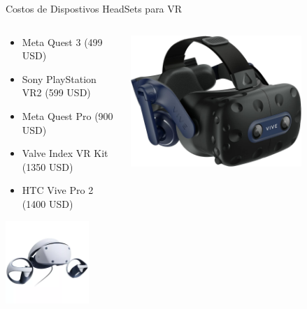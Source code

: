 
\begin{frame}{Costos de Dispostivos HeadSets para VR}
\begin{columns}
\begin{column}{0.49\textwidth}
\begin{itemize}
\item Meta Quest 3 (499 USD)
\item Sony PlayStation VR2 (599 USD)
\item Meta Quest Pro (900 USD)
\item Valve Index VR Kit (1350 USD)
\item HTC Vive Pro 2 (1400 USD)
\end{itemize}

\begin{center}
\includegraphics[width=0.75\textwidth]{Figs/sony.png}
\end{center}
\end{column}
\begin{column}{0.49\textwidth}
\begin{center}
\includegraphics[width=0.75\textwidth]{Figs/HTC.jpg}\\

\end{center}
\end{column}
\end{columns}
\end{frame}
